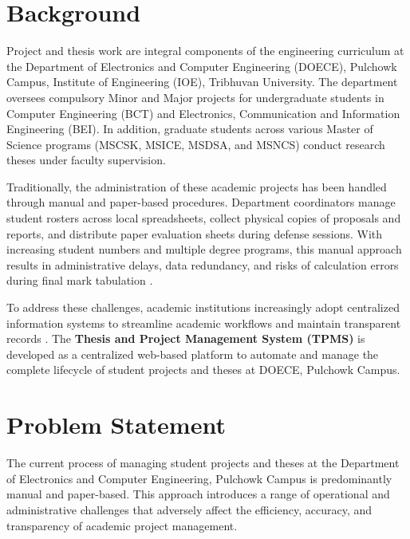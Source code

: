 \documentclass[12pt,a4paper]{report}
\begin{document}
\section{Background}
Project and thesis work are integral components of the engineering curriculum at the Department of Electronics and Computer Engineering (DOECE), Pulchowk Campus, Institute of Engineering (IOE), Tribhuvan University. The department oversees compulsory Minor and Major projects for undergraduate students in Computer Engineering (BCT) and Electronics, Communication and Information Engineering (BEI). In addition, graduate students across various Master of Science programs (MSCSK, MSICE, MSDSA, and MSNCS) conduct research theses under faculty supervision.

Traditionally, the administration of these academic projects has been handled through manual and paper-based procedures. Department coordinators manage student rosters across local spreadsheets, collect physical copies of proposals and reports, and distribute paper evaluation sheets during defense sessions. With increasing student numbers and multiple degree programs, this manual approach results in administrative delays, data redundancy, and risks of calculation errors during final mark tabulation \cite{pressman2015software}.

To address these challenges, academic institutions increasingly adopt centralized information systems to streamline academic workflows and maintain transparent records \cite{ko2021systematic}. The \textbf{Thesis and Project Management System (TPMS)} is developed as a centralized web-based platform to automate and manage the complete lifecycle of student projects and theses at DOECE, Pulchowk Campus.

\section{Problem Statement}
The current process of managing student projects and theses at the Department of Electronics and Computer Engineering, Pulchowk Campus is predominantly manual and paper-based. This approach introduces a range of operational and administrative challenges that adversely affect the efficiency, accuracy, and transparency of academic project management.
\end{document}
